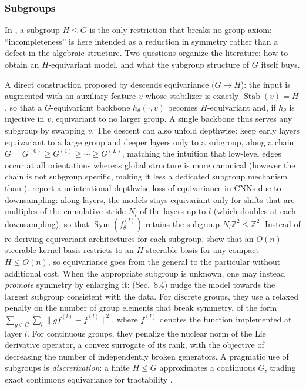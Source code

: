 \documentclass[mathematics,review,submit,moreauthors]{Definitions/mdpi}
\begin{document}
\subsubsection{Subgroups}\label{sec:subgroups}
In , a subgroup $H\le G$ is the only restriction that breaks no group axiom: ``incompleteness'' is here intended as a reduction in symmetry rather than a defect in the algebraic structure.
Two questions organize the literature: how to obtain an $H$-equivariant model, and what the subgroup structure of $G$ itself buys.

A direct construction proposed by \citet{goel2025} descends equivariance ($G\to H$): the input is augmented with an auxiliary feature $v$ whose stabilizer is exactly $\operatorname{Stab}(v)=H$, so that a $G$-equivariant backbone $h_\theta(\cdot,v)$ becomes $H$-equivariant and, if $h_\theta$ is injective in $v$, equivariant to no larger group.
A single backbone thus serves any subgroup by swapping $v$.
The descent can also unfold depthwise: \citet{weiler2019anips} keep early layers equivariant to a large group and deeper layers only to a subgroup, along a chain $G=G^{(0)}\ge G^{(1)}\ge\cdots\ge G^{(L)}$, matching the intuition that low-level edges occur at all orientations whereas global structure is more canonical (however the chain is not subgroup specific, making it less a dedicated subgroup mechanism than \citep{goel2025}).
\citet{zhang2019p3icml} report a unintentional depthwise loss of equivariance in CNNs due to downsampling: along layers, the models stays equivariant only for shifts that are multiples of the cumulative stride $N_l$ of the layers up to $l$ (which doubles at each downsampling), so that $\operatorname{Sym}(f_\theta^{(l)})$ retains the subgroup $N_l\mathbb{Z}^2\le\mathbb{Z}^2$.
Instead of re-deriving equivariant architectures for each subgroup, \citet{cesa2021} show that an $O(n)$-steerable kernel basis restricts to an $H$-steerable basis for any compact $H\le O(n)$, so equivariance goes from the general to the particular without additional cost.
When the appropriate subgroup is unknown, one may instead \emph{promote} symmetry by enlarging it: \citet{otto2025} (Sec.~8.4) nudge the model towards the largest subgroup consistent with the data.
For discrete groups, they use a relaxed penalty on the number of group elements that break symmetry, of the form $\sum_{g\in G} \sum_l \| g f^{(l)} - f^{(l)}\|^2$, where $f^{(l)}$ denotes the function implemented at layer $l$.
For continuous groups, they penalize the nuclear norm of the Lie derivative operator, a convex surrogate of its rank, with the objective of decreasing the number of independently broken generators.
A pragmatic use of subgroups is \emph{discretization}: a finite $H\le G$ approximates a continuous $G$, trading exact continuous equivariance for tractability \citep{cohen2016,worrall2018cv-e21ecmgs82ppv,ali2026}.
\end{document}
